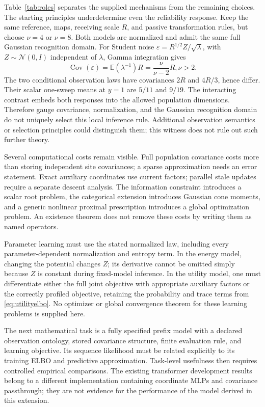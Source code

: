 \documentclass[11pt]{article}
\newcommand{\E}{\mathbb E}
\newcommand{\Cov}{\operatorname{Cov}}
\begin{document}
Table~\ref{tab:roles} separates the supplied mechanisms from the remaining choices. The starting principles underdetermine even the reliability response. Keep the same reference, maps, receiving scale $R$, and passive transformation rules, but choose $\nu=4$ or $\nu=8$. Both models are normalized and admit the same full Gaussian recognition domain. For Student noise $\varepsilon=R^{1/2}Z/\sqrt\lambda$, with $Z\sim\mathcal N(0,I)$ independent of $\lambda$, Gamma integration gives
\begin{equation}
\Cov(\varepsilon)=\E(\lambda^{-1})R=\frac{\nu}{\nu-2}R, \nu>2.
\label{eq:underdetermined}
\end{equation}
The two conditional observation laws have covariances $2R$ and $4R/3$, hence differ. Their scalar one-sweep means at $y=1$ are $5/11$ and $9/19$. The interacting contrast embeds both responses into the allowed population dimensions. Therefore gauge covariance, normalization, and the Gaussian recognition domain do not uniquely select this local inference rule. Additional observation semantics or selection principles could distinguish them; this witness does not rule out such further theory.

Several computational costs remain visible. Full population covariance costs more than storing independent site covariances; a sparse approximation needs an error statement. Exact auxiliary coordinates use current factors; parallel stale updates require a separate descent analysis. The information constraint introduces a scalar root problem, the categorical extension introduces Gaussian cone moments, and a generic nonlinear proximal prescription introduces a global optimization problem. An existence theorem does not remove these costs by writing them as named operators.

Parameter learning must use the stated normalized law, including every parameter-dependent normalization and entropy term. In the energy model, changing the potential changes $Z$; its derivative cannot be omitted simply because $Z$ is constant during fixed-model inference. In the utility model, one must differentiate either the full joint objective with appropriate auxiliary factors or the correctly profiled objective, retaining the probability and trace terms from \eqref{eq:utilityelbo}. No optimizer or global convergence theorem for these learning problems is supplied here.

The next mathematical task is a fully specified prefix model with a declared observation ontology, stored covariance structure, finite evaluation rule, and learning objective. Its sequence likelihood must be related explicitly to its training ELBO and predictive approximation. Task-level usefulness then requires controlled empirical comparisons. The existing transformer development results belong to a different implementation containing coordinate MLPs and covariance passthrough; they are not evidence for the performance of the model derived in this extension.
\end{document}
